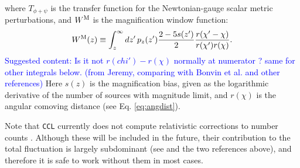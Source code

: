 \documentclass[\docopts]{\docclass}
\newcommand{\cont}[1]{\textcolor{blue}{Suggested content: #1}}
\newcommand{\ccl}{{\tt CCL}\xspace}
\begin{document}
\begin{itemize}
\begin{align}
        \end{align}
        where $T_{\phi+\psi}$ is the transfer function for the Newtonian-gauge scalar metric perturbations, and $W^{\rm M}$ is the magnification window function:
        \begin{equation}
          W^{\rm M}(z)\equiv\int_z^\infty dz'\,p_z(z')\frac{2-5s(z')}{2}\frac{r(\chi'-\chi)}{r(\chi')r(\chi)}.
        \end{equation}
        \cont{Is it not $r(chi')-r(\chi)$ normally at numerator ? same for other integrals below. (from Jeremy, comparing with Bonvin et al. and other references)}
        Here $s(z)$ is the magnification bias, given as the logarithmic derivative of the number of sources with magnitude limit, and $r(\chi)$ is the angular comoving distance (see Eq. \ref{eq:angdist}).
\end{itemize}
Note that \ccl currently does not compute relativistic corrections to number counts \cite{2011PhRvD..84d3516C,2011PhRvD..84f3505B}. Although these will be included in the future, their contribution to the total fluctuation is largely subdominant (see \cite{GReffects} and the two references above), and therefore it is safe to work without them in most cases.
\end{document}
